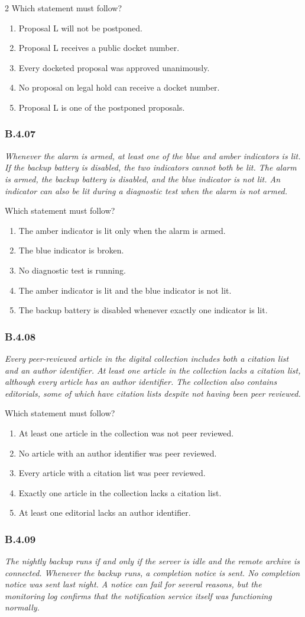 \documentclass[10pt]{extarticle}
\newcommand{\choice}[1]{\item #1}
\newcommand{\bankitem}[1]{\subsubsection*{#1}}
\begin{document}
\begin{multicols}{2}
Which statement must follow?
\begin{enumerate}[label=(\alph*)]
  \choice{Proposal L will not be postponed.}
  \choice{Proposal L receives a public docket number.}
  \choice{Every docketed proposal was approved unanimously.}
  \choice{No proposal on legal hold can receive a docket number.}
  \choice{Proposal L is one of the postponed proposals.}
\end{enumerate}
\bankitem{B.4.07}
\emph{Whenever the alarm is armed, at least one of the blue and amber indicators is lit. If the backup battery is disabled, the two indicators cannot both be lit. The alarm is armed, the backup battery is disabled, and the blue indicator is not lit. An indicator can also be lit during a diagnostic test when the alarm is not armed.}

Which statement must follow?
\begin{enumerate}[label=(\alph*)]
  \choice{The amber indicator is lit only when the alarm is armed.}
  \choice{The blue indicator is broken.}
  \choice{No diagnostic test is running.}
  \choice{The amber indicator is lit and the blue indicator is not lit.}
  \choice{The backup battery is disabled whenever exactly one indicator is lit.}
\end{enumerate}
\bankitem{B.4.08}
\emph{Every peer-reviewed article in the digital collection includes both a citation list and an author identifier. At least one article in the collection lacks a citation list, although every article has an author identifier. The collection also contains editorials, some of which have citation lists despite not having been peer reviewed.}

Which statement must follow?
\begin{enumerate}[label=(\alph*)]
  \choice{At least one article in the collection was not peer reviewed.}
  \choice{No article with an author identifier was peer reviewed.}
  \choice{Every article with a citation list was peer reviewed.}
  \choice{Exactly one article in the collection lacks a citation list.}
  \choice{At least one editorial lacks an author identifier.}
\end{enumerate}
\bankitem{B.4.09}
\emph{The nightly backup runs if and only if the server is idle and the remote archive is connected. Whenever the backup runs, a completion notice is sent. No completion notice was sent last night. A notice can fail for several reasons, but the monitoring log confirms that the notification service itself was functioning normally.}


\end{multicols}
\end{document}
